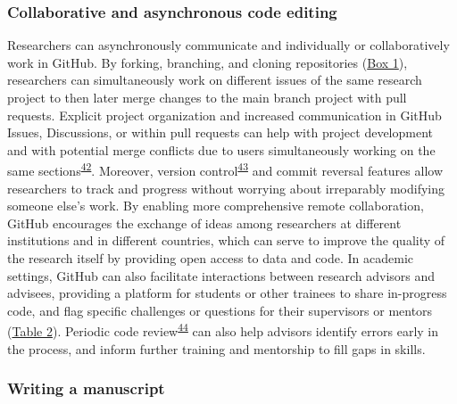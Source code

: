 \hypertarget{collaborative-and-asynchronous-code-editing}{%
\subsubsection{Collaborative and asynchronous code editing}\label{collaborative-and-asynchronous-code-editing}}

Researchers can asynchronously communicate and individually or collaboratively work in GitHub.
By forking, branching, and cloning repositories (\protect\hyperlink{definitions}{Box 1}), researchers can simultaneously work on different issues of the same research project to then later merge changes to the main branch project with pull requests.
Explicit project organization and increased communication in GitHub Issues, Discussions, or within pull requests can help with project development and with potential merge conflicts due to users simultaneously working on the same sections\textsuperscript{\protect\hyperlink{ref-1BJcvyTmV}{42}}.
Moreover, version control\textsuperscript{\protect\hyperlink{ref-K7nbP1Ty}{43}} and commit reversal features allow researchers to track and progress without worrying about irreparably modifying someone else's work.
By enabling more comprehensive remote collaboration, GitHub encourages the exchange of ideas among researchers at different institutions and in different countries, which can serve to improve the quality of the research itself by providing open access to data and code.
In academic settings, GitHub can also facilitate interactions between research advisors and advisees, providing a platform for students or other trainees to share in-progress code, and flag specific challenges or questions for their supervisors or mentors (\protect\hyperlink{tbl:roles}{Table 2}).
Periodic code review\textsuperscript{\protect\hyperlink{ref-hm9PaCLD}{44}} can also help advisors identify errors early in the process, and inform further training and mentorship to fill gaps in skills.

\hypertarget{writing-a-manuscript}{%
\subsubsection{Writing a manuscript}\label{writing-a-manuscript}}

